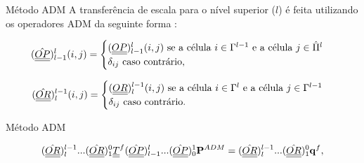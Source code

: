 \documentclass[professionalfont]{beamer}
\begin{document}
\begin{frame}{Método ADM}
    \small
    A transferência de escala para o nível superior ($l$) é feita utilizando os operadores ADM da seguinte forma \cite{Cusini2016}:

    \begin{equation}
        \label{eq:multinivel.1}
    (\hat{\underline{\underline{OP}}})^{l}_{l-1} (i,j) =
        \begin{cases}
            (\underline{\underline{OP}})^{l}_{l-1} (i,j) \text{ se a célula } i \in \Gamma^{l-1} \text{ e a célula } j \in \hat{\Pi}^{l}\\
            \delta_{ij} \text{ caso contrário},\\
        \end{cases}
    \end{equation}

    \begin{equation}
        \label{eq:multinivel.2}
    (\hat{\underline{\underline{OR}}})^{l-1}_{l} (i,j) =
        \begin{cases}
            (\underline{\underline{OR}})^{l-1}_{l} (i,j) \text{ se a célula } i \in \Gamma^{l} \text{ e a célula } j \in \Gamma^{l-1}\\
            \delta_{ij} \text{ caso contrário}.\\
        \end{cases}
    \end{equation}

\end{frame}

\begin{frame}{Método ADM}
    \begin{figure}
        \caption{Representação dos conjuntos $\Omega^{l}$, $\Pi^{l}$ e $\Gamma^{l}$}
        \begin{subfigure}{.3\textwidth}
            \centering
            \resizebox*{3cm}{!}{
            }
            \label{fig:multinivel.2.a}
        \end{subfigure}
        \begin{subfigure}{.3\textwidth}
            \centering
            \resizebox*{3cm}{!}{
            }
            \label{fig:multinivel.2.b}
        \end{subfigure}
        \begin{subfigure}{.3\textwidth}
            \centering
            \resizebox*{3cm}{!}{
            }
            \label{fig:multinivel.2.c}
        \end{subfigure}
        \label{fig:multinivel.2}
    \end{figure}

    \begin{equation}
        \label{eq:multinivel.3}
        ( \hat{\underline{\underline{OR}}} )^{l-1}_{l} ... ( \hat{\underline{\underline{OR}}} )^{0}_{1} \underline{\underline{T}}^{f} (\hat{\underline{\underline{OP}}})^{l}_{l-1} ... (\hat{\underline{\underline{OP}}})^{1}_{0} \bold{P}^{ADM} = ( \hat{\underline{\underline{OR}}} )^{l-1}_{l} ... ( \hat{\underline{\underline{OR}}} )^{0}_{1} \mathbf{q}^{f},
    \end{equation}
\end{frame}
\end{document}
